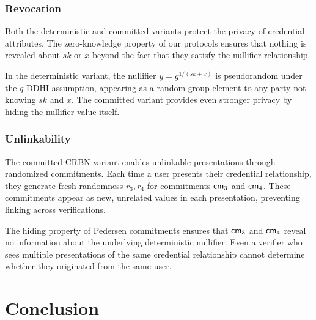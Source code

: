 \subsubsection{Revocation}

Both the deterministic and committed variants protect the privacy of credential attributes. The zero-knowledge property of our protocols ensures that nothing is revealed about $sk$ or $x$ beyond the fact that they satisfy the nullifier relationship.

In the deterministic variant, the nullifier $y = g^{1/(sk+x)}$ is pseudorandom under the $q$-DDHI assumption, appearing as a random group element to any party not knowing $sk$ and $x$. The committed variant provides even stronger privacy by hiding the nullifier value itself.

\subsubsection{Unlinkability}

The committed CRBN variant enables unlinkable presentations through randomized commitments. Each time a user presents their credential relationship, they generate fresh randomness $r_3, r_4$ for commitments $\mathsf{cm}_3$ and $\mathsf{cm}_4$. These commitments appear as new, unrelated values in each presentation, preventing linking across verifications.

The hiding property of Pedersen commitments ensures that $\mathsf{cm}_3$ and $\mathsf{cm}_4$ reveal no information about the underlying deterministic nullifier. Even a verifier who sees multiple presentations of the same credential relationship cannot determine whether they originated from the same user.


\section{Conclusion}


